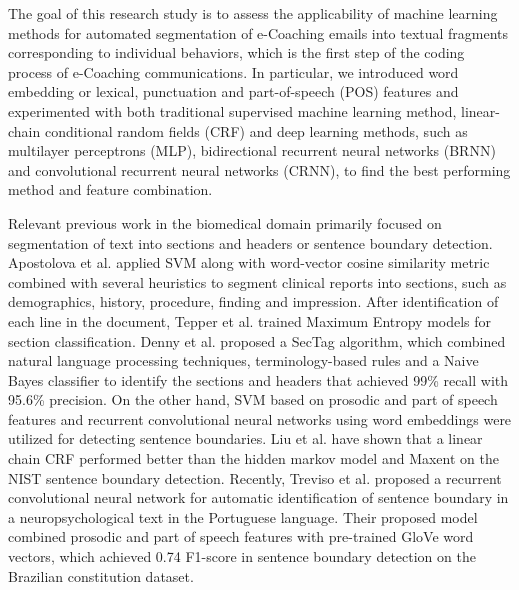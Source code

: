 \documentclass{amia}
\begin{document}
The goal of this research study is to assess the applicability of machine learning methods for automated segmentation of e-Coaching emails into textual fragments corresponding to individual behaviors, which is the first step of the coding process of e-Coaching communications. In particular, we introduced word embedding or lexical, punctuation and  part-of-speech (POS) features and experimented with both traditional supervised machine learning method, linear-chain conditional random fields (CRF)\cite{lafferty2001conditional} and deep learning methods, such as multilayer perceptrons (MLP),\cite{rumelhart1986learning} bidirectional recurrent neural networks (BRNN)\cite{schuster1997bidirectional} and convolutional recurrent neural networks (CRNN),\cite{treviso2017sentence} to find the best performing method and feature combination. 

Relevant previous work in the biomedical domain primarily focused on segmentation of text into sections and headers\cite{apostolova2009automatic,denny2009evaluation,tepper2012statistical,cho2002text} or sentence boundary detection.\cite{griffis2016quantitative,kreuzthaler2015detection,treviso2017sentence} Apostolova et al. applied SVM along with word-vector cosine similarity metric combined with several heuristics to segment clinical reports into sections, such as demographics, history, procedure, finding and impression.\cite{apostolova2009automatic} After identification of each line in the document, Tepper et al. trained Maximum Entropy models for section classification.\cite{tepper2012statistical} Denny et al. proposed a SecTag algorithm, which combined natural language processing techniques, terminology-based rules and a Naive Bayes classifier to identify the sections and headers that achieved 99\% recall with 95.6\% precision. \cite{denny2009evaluation} On the other hand, SVM based on prosodic and part of speech features \cite{kreuzthaler2015detection} and recurrent convolutional neural networks using word embeddings \cite{griffis2016quantitative} were utilized for detecting sentence boundaries. Liu et al. have shown that a linear chain CRF performed better than the hidden markov model and Maxent on the NIST sentence boundary detection.\cite{liu2005using} Recently, Treviso et al. proposed a recurrent convolutional neural network for automatic identification of sentence boundary in a neuropsychological text in the Portuguese language.\cite{treviso2017sentence} Their proposed model combined prosodic and part of speech features with pre-trained GloVe word vectors,\cite{pennington2014glove} which achieved 0.74 F1-score in sentence boundary detection on the Brazilian constitution dataset. 
\end{document}
